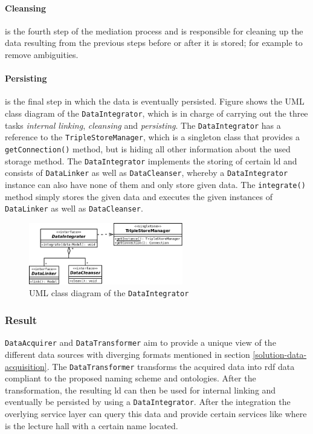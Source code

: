 \documentclass[draft,final]{vutinfth} %
\begin{document}
\paragraph{Cleansing} is the fourth step of the mediation process and is responsible for cleaning up the data resulting from the previous steps before or after it is stored; for example to remove ambiguities.

\paragraph{Persisting} is the final step in which the data is eventually persisted. Figure shows the UML class diagram of the \texttt{DataIntegrator}, which is in charge of carrying out the three tasks \textit{internal linking}, \textit{cleansing} and \textit{persisting}. The \texttt{DataIntegrator} has a reference to the \texttt{TripleStoreManager}, which is a singleton class that provides a \texttt{getConnection()} method, but is hiding all other information about the used storage method. The \texttt{DataIntegrator} implements the storing of certain \gls{ld} and consists of \texttt{DataLinker} as well as \texttt{DataCleanser}, whereby a \texttt{DataIntegrator} instance can also have none of them and only store given data. The \texttt{integrate()} method simply stores the given data and executes the given instances of \texttt{DataLinker} as well as \texttt{DataCleanser}. 

\begin{figure}[h]
    \centering
    \includegraphics[width=0.6\textwidth]{graphics/solution/architecture/dataintegrator.png}
    \caption{UML class diagram of the \texttt{DataIntegrator}}
    \label{fig:solution-architectural-prototype:acquirer-uml-class-dia}
\end{figure}

\subsubsection{Result}
\texttt{DataAcquirer} and \texttt{DataTransformer} aim to provide a unique view of the different data sources with diverging formats mentioned in section \ref{solution-data-acquisition}. The \texttt{DataTransformer} transforms the acquired data into \gls{rdf} data compliant to the proposed naming scheme and ontologies. After the transformation, the resulting \gls{ld} can then be used for internal linking and eventually be persisted by using a \texttt{DataIntegrator}. After the integration the overlying service layer can query this data and provide certain services like where is the lecture hall with a certain name located.
\end{document}
